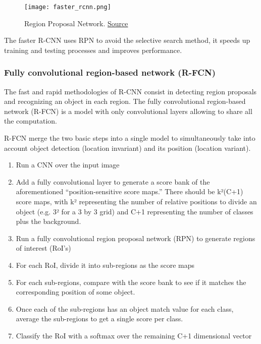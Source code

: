 \begin{figure}[H]
    \centering
    \texttt{[image: faster\_rcnn.png]}
	\caption[Region Proposal Network]{Region Proposal Network.  \href{https://arxiv.org/pdf/1506.01497.pdf}{Source}}
	\label{fig:rpn}
\end{figure}

The faster R-CNN uses RPN to avoid the selective search method, it speeds up training and testing processes and improves performance.

\pagebreak\subsubsection{Fully convolutional region-based network (R-FCN)}
The fast and rapid methodologies of R-CNN consist in detecting region proposals and recognizing an object in each region. The fully convolutional region-based network (R-FCN) is a model with only convolutional layers allowing to share all the computation.

R-FCN merge the two basic steps into a single model to simultaneously take into account object detection (location invariant) and its position (location variant).

\begin{enumerate}
    \item Run a CNN over the input image
    \item Add a fully convolutional layer to generate a score bank of the aforementioned “position-sensitive score maps.” There should be k²(C+1) score maps, with k² representing the number of relative positions to divide an object (e.g. 3² for a 3 by 3 grid) and C+1 representing the number of classes plus the background.
    \item Run a fully convolutional region proposal network (RPN) to generate regions of interest (RoI’s)
    \item For each RoI, divide it into sub-regions as the score maps
    \item For each sub-regions, compare with the score bank to see if it matches the corresponding position of some object.
    \item Once each of the sub-regions has an object match value for each class, average the sub-regions to get a single score per class.
    \item Classify the RoI with a softmax over the remaining C+1 dimensional vector
\end{enumerate}


